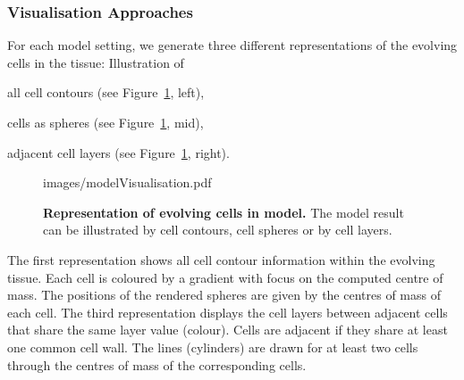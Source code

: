\documentclass[11pt,a4paper, final]{article}
\begin{document}
\subsubsection{Visualisation Approaches}
\noindent
For each model setting, we generate three different representations of the evolving cells in the tissue: Illustration of
\begin{inparaenum}
\item all cell contours (see Figure~\ref{fig:modelVisualisation}, left),
\item cells as spheres (see Figure~\ref{fig:modelVisualisation}, mid),
\item adjacent cell layers (see Figure~\ref{fig:modelVisualisation}, right).
\end{inparaenum}
%
\begin{figure}[htbp]
	\begin{center}
		\begin{overpic}[width=1.\linewidth]{images/modelVisualisation.pdf}
		\end{overpic}
\caption[Representation of evolving cells in model.]
{
{\bf Representation of evolving cells in model.} The model result can be illustrated by cell contours, cell spheres or by cell layers.
}
	\label{fig:modelVisualisation}
	\end{center}
\end{figure}
%
The first representation shows all cell contour information within the evolving tissue. Each cell is coloured by a gradient with focus on the computed centre of mass. The positions of the rendered spheres are given by the centres of mass of each cell. The third representation displays the cell layers between adjacent cells that share the same layer value (colour). Cells are adjacent if they share at least one common cell wall. The lines (cylinders) are drawn for at least two cells through the centres of mass of the corresponding cells.
\end{document}
